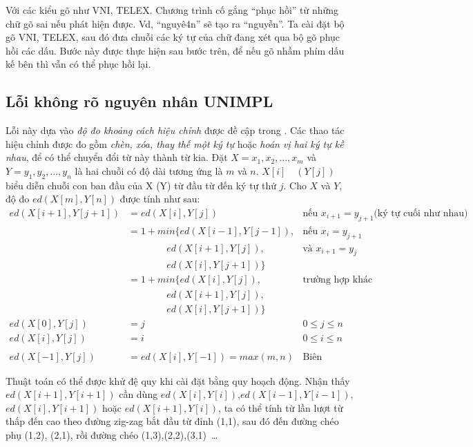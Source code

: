 \documentclass[a4paper,oneside]{book} %
\theoremstyle{break}
\begin{document}
Với các kiểu gõ như VNI, TELEX. Chương trình cố gắng ``phục hồi'' từ
những chữ gõ sai nếu phát hiện được. Vd, ``nguyê4n'' sẽ tạo ra
``nguyễn''. Ta cài đặt bộ gõ VNI, TELEX, sau đó đưa chuỗi các ký tự
của chữ đang xét qua bộ gõ phục hồi các dấu. Bước này được thực hiện
sau bước trên, để nếu gõ nhầm phím dấu kế bên thì vẫn có thể phục hồi
lại.


\subsection{Lỗi không rõ nguyên nhân UNIMPL}

\label{algo:ed}
Lỗi này dựa vào {\em độ đo khoảng cách hiệu chỉnh} được đề cập
trong \cite{Oflazer}. Các thao tác hiệu chỉnh được đo gồm {\em chèn,
xóa, thay thế một ký tự} hoặc {\em hoán vị hai ký tự kề nhau}, để có
thể chuyển đổi từ này thành từ kia. Đặt $X = x_1, x_2, \ldots, x_m$ và
$Y = y_1,y_2,\ldots,y_n$ là hai chuỗi có độ dài tương ứng là $m$ và
$n$. $X[i]\quad(Y[j])$ biểu diễn chuỗi con ban đầu của X (Y) từ đầu từ
đến ký tự thứ $j$. Cho $X$ và $Y$, độ đo $ed(X[m],Y[n])$ được tính như
sau:
\begin{equation}
\begin{array}{rll}
  ed(X[i+1],Y[j+1]) &= ed(X[i],Y[j]) & \text{nếu $x_{i+1}=y_{j+1}$
  (ký tự cuối như nhau)}\\
                    &= 1+min\{ed(X[i-1],Y[j-1]), & \text{nếu $x_i=y_{j+1}$}\\
                    &\qquad\qquad ed(X[i+1],Y[j]), & \text{và $x_{i+1}=y_j$}\\
                    &\qquad\qquad ed(X[i],Y[j+1])\}\\
                    &= 1+min\{ed(X[i],Y[j]),&\text{trường hợp khác}\\
                    &\qquad\qquad ed(X[i+1],Y[j]),\\
                    &\qquad\qquad ed(X[i],Y[j+1])\}\\
  ed(X[0],Y[j])     &=j & 0 \le j \le n\\
  ed(X[i],Y[j])     &=i & 0 \le i \le n\\\\
  ed(X[-1],Y[j])    &=ed(X[i],Y[-1]) = max(m,n)&\text{Biên}
\end{array}
\end{equation}

Thuật toán có thể được khử đệ quy khi cài đặt bằng quy hoạch
động. Nhận thấy $ed(X[i+1],Y[i+1])$ cần dùng
$ed(X[i],Y[i])$,$ed(X[i-1],Y[i-1])$,$ed(X[i],Y[i+1])$ hoặc
$ed(X[i+1],Y[i])$, ta có thể tính từ lần lượt từ thấp đến cao theo
đường zig-zag bắt đầu từ đỉnh (1,1), sau đó đến đường chéo phụ (1,2),
(2,1), rồi đường chéo (1,3),(2,2),(3,1)~\ldots
\end{document}
